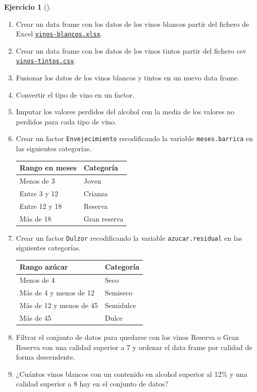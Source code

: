 \documentclass[
  a4paper,
]{scrreport}
\theoremstyle{definition}
\newtheorem{exercise}{Ejercicio}[chapter]
\theoremstyle{remark}
\begin{document}
\begin{exercise}[]
\begin{enumerate}
\def\labelenumi{\alph{enumi}.}
\item
  Crear un data frame con los datos de los vinos blancos partir del
  fichero de Excel
  \href{datos/vinos-blancos.xlsx}{\texttt{vinos-blancos.xlsx}}.
\item
  Crear un data frame con los datos de los vinos tintos partir del
  fichero csv \href{datos/vinos-tintos.csv}{\texttt{vinos-tintos.csv}}.
\item
  Fusionar los datos de los vinos blancos y tintos en un nuevo data
  frame.
\item
  Convertir el tipo de vino en un factor.
\item
  Imputar los valores perdidos del alcohol con la media de los valores
  no perdidos para cada tipo de vino.
\item
  Crear un factor \texttt{Envejecimiento} recodificando la variable
  \texttt{meses.barrica} en las siguientes categorías.

  \begin{longtable}[]{@{}ll@{}}
  \toprule\noalign{}
  Rango en meses & Categoría \\
  \midrule\noalign{}
  \endhead
  \bottomrule\noalign{}
  \endlastfoot
  Menos de 3 & Joven \\
  Entre 3 y 12 & Crianza \\
  Entre 12 y 18 & Reserva \\
  Más de 18 & Gran reserva \\
  \end{longtable}
\item
  Crear un factor \texttt{Dulzor} recodificando la variable
  \texttt{azucar.residual} en las siguientes categorías.

  \begin{longtable}[]{@{}ll@{}}
  \toprule\noalign{}
  Rango azúcar & Categoría \\
  \midrule\noalign{}
  \endhead
  \bottomrule\noalign{}
  \endlastfoot
  Menos de 4 & Seco \\
  Más de 4 y menos de 12 & Semiseco \\
  Más de 12 y menos de 45 & Semidulce \\
  Más de 45 & Dulce \\
  \end{longtable}
\item
  Filtrar el conjunto de datos para quedarse con los vinos Reserva o
  Gran Reserva con una calidad superior a 7 y ordenar el data frame por
  calidad de forma descendente.
\item
  ¿Cuántos vinos blancos con un contenido en alcohol superior al 12\% y
  una calidad superior a 8 hay en el conjunto de datos?
\end{enumerate}

\end{exercise}
\end{document}

